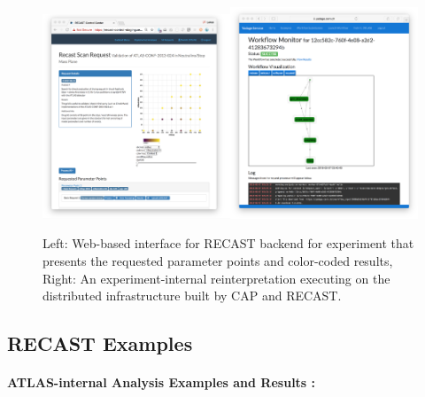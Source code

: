 \begin{figure}[h]
\begin{center}
\includegraphics[width=0.5\textwidth,angle=0]{ch5-figures/requestview.png}\includegraphics[width=0.5\textwidth,angle=0]{ch5-figures/monitor.png}

\end{center}
\caption{
Left: Web-based interface for RECAST backend for experiment that presents the requested parameter points and color-coded results,
Right: An experiment-internal reinterpretation executing on the distributed infrastructure built by CAP and RECAST.}
\label{fig:recast-cc}
\end{figure}

\subsection{RECAST Examples}

\paragraph{ATLAS-internal Analysis Examples and Results :}

